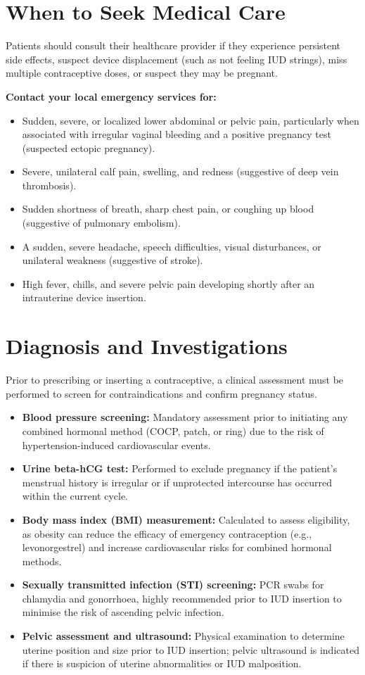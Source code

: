 \section*{When to Seek Medical Care}
Patients should consult their healthcare provider if they experience persistent side effects, suspect device displacement (such as not feeling IUD strings), miss multiple contraceptive doses, or suspect they may be pregnant.

\textbf{Contact your local emergency services for:}
\begin{itemize}
    \item Sudden, severe, or localized lower abdominal or pelvic pain, particularly when associated with irregular vaginal bleeding and a positive pregnancy test (suspected ectopic pregnancy).
    \item Severe, unilateral calf pain, swelling, and redness (suggestive of deep vein thrombosis).
    \item Sudden shortness of breath, sharp chest pain, or coughing up blood (suggestive of pulmonary embolism).
    \item A sudden, severe headache, speech difficulties, visual disturbances, or unilateral weakness (suggestive of stroke).
    \item High fever, chills, and severe pelvic pain developing shortly after an intrauterine device insertion.
\end{itemize}

\section*{Diagnosis and Investigations}
Prior to prescribing or inserting a contraceptive, a clinical assessment must be performed to screen for contraindications and confirm pregnancy status.

\begin{itemize}
    \item \textbf{Blood pressure screening:} Mandatory assessment prior to initiating any combined hormonal method (COCP, patch, or ring) due to the risk of hypertension-induced cardiovascular events.
    \item \textbf{Urine beta-hCG test:} Performed to exclude pregnancy if the patient's menstrual history is irregular or if unprotected intercourse has occurred within the current cycle.
    \item \textbf{Body mass index (BMI) measurement:} Calculated to assess eligibility, as obesity can reduce the efficacy of emergency contraception (e.g., levonorgestrel) and increase cardiovascular risks for combined hormonal methods.
    \item \textbf{Sexually transmitted infection (STI) screening:} PCR swabs for chlamydia and gonorrhoea, highly recommended prior to IUD insertion to minimise the risk of ascending pelvic infection.
    \item \textbf{Pelvic assessment and ultrasound:} Physical examination to determine uterine position and size prior to IUD insertion; pelvic ultrasound is indicated if there is suspicion of uterine abnormalities or IUD malposition.
\end{itemize}

